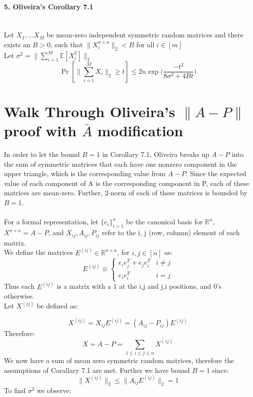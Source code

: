 \documentclass[10pt]{article}
\begin{document}
\paragraph{5. Oliveira's Corollary 7.1}\mbox{}\\
Let $X_1, ... X_M$ be mean-zero independent symmetric random matrices and there exists an $B>0$, such that $\|X_i^{n\times n}\|_2 < B$ for all $i\in [m]$\\
Let $\sigma^2 = \|\sum_{i=1}^{M}\mathbb{E}[X_i^2] \|_2$
\begin{equation}
\Pr[\|\sum_{i=1}^{M}X_i \|_2 \geq t] \leq 2n\exp\Big(\frac{-t^2}{8\sigma^2 + 4Bt}\Big)
\end{equation}

\section{Walk Through Oliveira's $\|A-P\| $ proof with $\bar{A}$ modification}
In order to let the bound $B = 1$ in Corollary 7.1, Oliveira breaks up $A-P$ into the sum of symmetric matrices that each have one nonzero component in the upper triangle, which is the corresponding value from $A-P$.  Since the expected value of each component of A is the corresponding component in P, each of these matrices are mean-zero. Further, 2-norm of each of these matrices is bounded by $B =1$.\\\\
For a formal representation, let $\{e_i\}^n_{i=1}$ be the canonical basis for $\mathbb{R}^n$, $X^{n\times n} = A-P$, and $X_{ij}, A_{ij}, P_{ij}$ refer to the i, j (row, column) element of each matrix.\\
We define the matrices $E^{(ij)} \in \mathbb{R}^{n\times n}$, for $i,j \in [n]$ as:
\begin{equation*}
E^{(ij)} \equiv 
\left\{
\begin{array}{ll}
e_ie_j^T + e_je_i^T  &  i\neq j \\
e_ie_i^T & i = j
\end{array}
\right.
\end{equation*}
Thus each $E^{(ij)}$ is a matrix with a 1 at the i,j and j,i positions, and 0's otherwise.\\
Let $X^{(ij)}$ be defined as:

\begin{equation*}
X^{(ij)} = X_{ij}E^{(ij)} = (A_{ij} - P_{ij})E^{(ij)}
\end{equation*}
Therefore:
\begin{equation*}
X = A-P = \sum_{1\leq i\leq j \leq n }^{} X^{(ij)}
\end{equation*}
We now have a sum of mean zero symmetric random matrices, therefore the assumptions of Corallary 7.1 are met. Further we have bound $B=1$ since:
\begin{equation*}
\|X^{(ij)}\|_2 \leq \|A_{ij}E^{(ij)}\|_2 = 1
\end{equation*}
To find $\sigma^2$ we observe:
\end{document}
